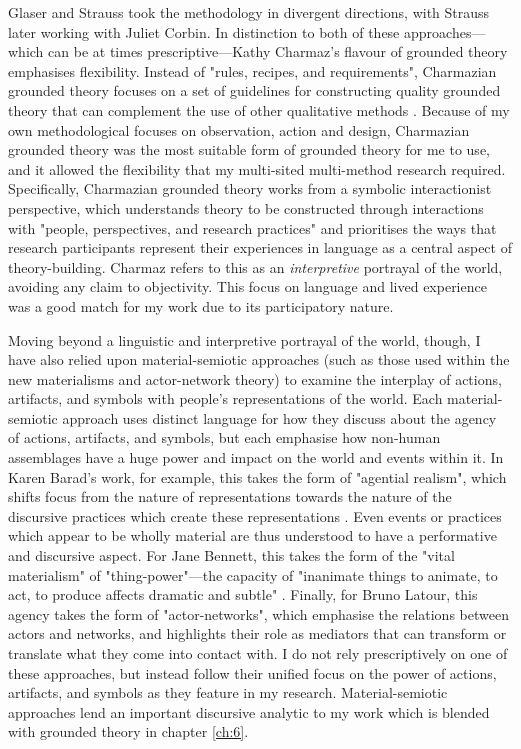 Glaser and Strauss took the methodology in divergent directions, with Strauss later working with Juliet Corbin. In distinction to both of these approaches—which can be at times prescriptive—Kathy Charmaz's flavour of grounded theory emphasises flexibility. Instead of "rules, recipes, and requirements", Charmazian grounded theory focuses on a set of guidelines for constructing quality grounded theory that can complement the use of other qualitative methods  \cite[p. 10]{charmaz_constructing_2006}. Because of my own methodological focuses on observation, action and design, Charmazian grounded theory was the most suitable form of grounded theory for me to use, and it allowed the flexibility that my multi-sited multi-method research required. Specifically, Charmazian grounded theory works from a symbolic interactionist perspective, which understands theory to be constructed through interactions with "people, perspectives, and research practices" \citeyearpar[p. 10]{charmaz_constructing_2006} and prioritises the ways that research participants represent their experiences in language as a central aspect of theory-building. Charmaz refers to this as an \textit{interpretive} portrayal of the world, avoiding any claim to objectivity. This focus on language and lived experience was a good match for my work due to its participatory nature. 

Moving beyond a linguistic and interpretive portrayal of the world, though, I have also relied upon material-semiotic approaches (such as those used within the new materialisms and actor-network theory) to examine the interplay of actions, artifacts, and symbols with people's representations of the world. Each material-semiotic approach uses distinct language for how they discuss about the agency of actions, artifacts, and symbols, but each emphasise how non-human assemblages have a huge power and impact on the world and events within it. In Karen Barad's work, for example, this takes the form of "agential realism", which shifts focus from the nature of representations towards the nature of the discursive practices which create these representations \citep[p. 45]{barad_meeting_2007}. Even events or practices which appear to be wholly material are thus understood to have a performative and discursive aspect. For Jane Bennett, this takes the form of the "vital materialism" of "thing-power"—the capacity of "inanimate things to animate, to act, to produce affects dramatic and subtle" \citep[p. 6]{bennett_vibrant_2010}. Finally,  for Bruno Latour, this agency takes the form of "actor-networks", which emphasise the relations between actors and networks, and highlights their role as mediators that can transform or translate what they come into contact with. I do not rely prescriptively on one of these approaches, but instead follow their unified focus on the power of actions, artifacts, and symbols as they feature in my research. Material-semiotic approaches lend an important discursive analytic to my work which is blended with grounded theory in chapter \ref{ch:6}. 

